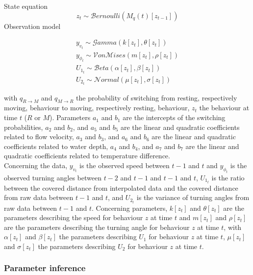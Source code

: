 \documentclass[
  letterpaper,
  DIV=11,
  numbers=noendperiod]{scrartcl}
\begin{document}
State equation \[z_{t} \sim \mathcal{B}ernoulli(M_{q}(t)[z_{t-1}])\]
Observation model

\[\begin{array}{l}
y_{v_{t}} \sim \mathcal{G}amma(k[z_{t}], \theta[z_{t}])\\
y_{\phi_{t}} \sim \mathcal{V}on\mathcal{M}ises(m[z_{t}], \rho[z_{t}])\\
U_{1_{t}} \sim \mathcal{B}eta(\alpha[z_{t}], \beta[z_{t}])\\
U_{2_{t}} \sim \mathcal{N}ormal(\mu[z_{t}], \sigma[z_{t}])
\end{array}\]

with \(q_{R \rightarrow M}\) and \(q_{M \rightarrow R}\) the probability
of switching from resting, respectively moving, behaviour to moving,
respectively resting, behaviour, \(z_{t}\) the behaviour at time \(t\)
(\(R\) or \(M\)). Parameters \(a_{1}\) and \(b_{1}\) are the intercepts
of the switching probabilities, \(a_{2}\) and \(b_{2}\), and \(a_{5}\)
and \(b_{5}\) are the linear and quadratic coefficients related to flow
velocity, \(a_{3}\) and \(b_{3}\), and \(a_{6}\) and \(b_{6}\) are the
linear and quadratic coefficients related to water depth, \(a_{4}\) and
\(b_{4}\), and \(a_{7}\) and \(b_{7}\) are the linear and quadratic
coefficients related to temperature difference.\\
Concerning the data, \(y_{v_{t}}\) is the observed speed between \(t-1\)
and \(t\) and \(y_{\phi_{t}}\) is the observed turning angles between
\(t-2\) and \(t-1\) and \(t-1\) and \(t\), \(U_{1_{t}}\) is the ratio
between the covered distance from interpolated data and the covered
distance from raw data between \(t-1\) and \(t\), and \(U_{2_{t}}\) is
the variance of turning angles from raw data between \(t-1\) and \(t\).
Concerning parameters, \(k[z_{t}]\) and \(\theta[z_{t}]\) are the
parameters describing the speed for behaviour \(z\) at time \(t\) and
\(m[z_{t}]\) and \(\rho[z_{t}]\) are the parameters describing the
turning angle for behaviour \(z\) at time \(t\), with \(\alpha[z_{t}]\)
and \(\beta[z_{t}]\) the parameters describing \(U_{1}\) for behaviour
\(z\) at time \(t\), \(\mu[z_{t}]\) and \(\sigma[z_{t}]\) the parameters
describing \(U_{2}\) for behaviour \(z\) at time \(t\).

\hypertarget{parameter-inference}{%
\subsubsection{Parameter inference}\label{parameter-inference}}
\end{document}
